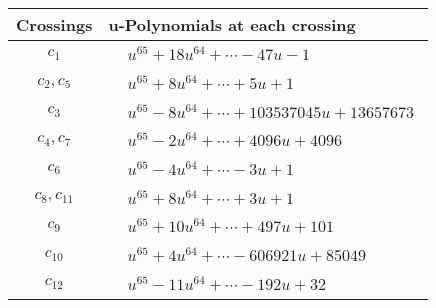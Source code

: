 \documentclass[1p]{elsarticle_modified}
\theoremstyle{definition}
\begin{document}
\begin{tabular}{m{50pt}|m{274pt}}
Crossings & \hspace{64pt}u-Polynomials at each crossing \\
\hline $$\begin{aligned}c_{1}\end{aligned}$$&$\begin{aligned}
&u^{65}+18 u^{64}+\cdots-47 u-1
\end{aligned}$\\
\hline $$\begin{aligned}c_{2},c_{5}\end{aligned}$$&$\begin{aligned}
&u^{65}+8 u^{64}+\cdots+5 u+1
\end{aligned}$\\
\hline $$\begin{aligned}c_{3}\end{aligned}$$&$\begin{aligned}
&u^{65}-8 u^{64}+\cdots+103537045 u+13657673
\end{aligned}$\\
\hline $$\begin{aligned}c_{4},c_{7}\end{aligned}$$&$\begin{aligned}
&u^{65}-2 u^{64}+\cdots+4096 u+4096
\end{aligned}$\\
\hline $$\begin{aligned}c_{6}\end{aligned}$$&$\begin{aligned}
&u^{65}-4 u^{64}+\cdots-3 u+1
\end{aligned}$\\
\hline $$\begin{aligned}c_{8},c_{11}\end{aligned}$$&$\begin{aligned}
&u^{65}+8 u^{64}+\cdots+3 u+1
\end{aligned}$\\
\hline $$\begin{aligned}c_{9}\end{aligned}$$&$\begin{aligned}
&u^{65}+10 u^{64}+\cdots+497 u+101
\end{aligned}$\\
\hline $$\begin{aligned}c_{10}\end{aligned}$$&$\begin{aligned}
&u^{65}+4 u^{64}+\cdots-606921 u+85049
\end{aligned}$\\
\hline $$\begin{aligned}c_{12}\end{aligned}$$&$\begin{aligned}
&u^{65}-11 u^{64}+\cdots-192 u+32
\end{aligned}$\\
\hline
\end{tabular}\\~\\
\end{document}
